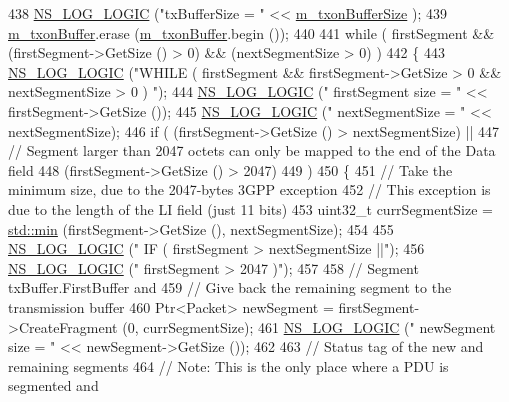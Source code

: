 \begin{DoxyCode}
438   \hyperlink{group__logging_ga88acd260151caf2db9c0fc84997f45ce}{NS\_LOG\_LOGIC} (\textcolor{stringliteral}{"txBufferSize      = "} << \hyperlink{classns3_1_1LteRlcAm_a3e8db6b5bc1d3fcc215d554e8d347eda}{m\_txonBufferSize} );
439   \hyperlink{classns3_1_1LteRlcAm_ad8ba4549a7c78cfe0e528d2e9cc465f8}{m\_txonBuffer}.erase (\hyperlink{classns3_1_1LteRlcAm_ad8ba4549a7c78cfe0e528d2e9cc465f8}{m\_txonBuffer}.begin ());
440 
441   \textcolor{keywordflow}{while} ( firstSegment && (firstSegment->GetSize () > 0) && (nextSegmentSize > 0) )
442     \{
443       \hyperlink{group__logging_ga88acd260151caf2db9c0fc84997f45ce}{NS\_LOG\_LOGIC} (\textcolor{stringliteral}{"WHILE ( firstSegment && firstSegment->GetSize > 0 && nextSegmentSize > 0 )
      "});
444       \hyperlink{group__logging_ga88acd260151caf2db9c0fc84997f45ce}{NS\_LOG\_LOGIC} (\textcolor{stringliteral}{"    firstSegment size = "} << firstSegment->GetSize ());
445       \hyperlink{group__logging_ga88acd260151caf2db9c0fc84997f45ce}{NS\_LOG\_LOGIC} (\textcolor{stringliteral}{"    nextSegmentSize   = "} << nextSegmentSize);
446       \textcolor{keywordflow}{if} ( (firstSegment->GetSize () > nextSegmentSize) ||
447            \textcolor{comment}{// Segment larger than 2047 octets can only be mapped to the end of the Data field}
448            (firstSegment->GetSize () > 2047)
449          )
450         \{
451           \textcolor{comment}{// Take the minimum size, due to the 2047-bytes 3GPP exception}
452           \textcolor{comment}{// This exception is due to the length of the LI field (just 11 bits)}
453           uint32\_t currSegmentSize = \hyperlink{80211b_8c_ac6afabdc09a49a433ee19d8a9486056d}{std::min} (firstSegment->GetSize (), nextSegmentSize);
454 
455           \hyperlink{group__logging_ga88acd260151caf2db9c0fc84997f45ce}{NS\_LOG\_LOGIC} (\textcolor{stringliteral}{"    IF ( firstSegment > nextSegmentSize ||"});
456           \hyperlink{group__logging_ga88acd260151caf2db9c0fc84997f45ce}{NS\_LOG\_LOGIC} (\textcolor{stringliteral}{"         firstSegment > 2047 )"});
457 
458           \textcolor{comment}{// Segment txBuffer.FirstBuffer and}
459           \textcolor{comment}{// Give back the remaining segment to the transmission buffer}
460           Ptr<Packet> newSegment = firstSegment->CreateFragment (0, currSegmentSize);
461           \hyperlink{group__logging_ga88acd260151caf2db9c0fc84997f45ce}{NS\_LOG\_LOGIC} (\textcolor{stringliteral}{"    newSegment size   = "} << newSegment->GetSize ());
462 
463           \textcolor{comment}{// Status tag of the new and remaining segments}
464           \textcolor{comment}{// Note: This is the only place where a PDU is segmented and}

\end{DoxyCode}

